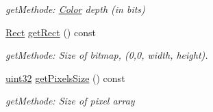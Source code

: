 \begin{DoxyCompactItemize}
\begin{DoxyCompactList}\small\item\em getMethode: \hyperlink{class_f2_c_1_1_color}{Color} depth (in bits) \item\end{DoxyCompactList}\item 
\hypertarget{class_f2_c_1_1_bitmap_aad73aad4b46f5f6f95815a734a8a1282}{
\hyperlink{class_f2_c_1_1_rect}{Rect} \hyperlink{class_f2_c_1_1_bitmap_aad73aad4b46f5f6f95815a734a8a1282}{getRect} () const }
\label{class_f2_c_1_1_bitmap_aad73aad4b46f5f6f95815a734a8a1282}

\begin{DoxyCompactList}\small\item\em getMethode: Size of bitmap, (0,0, width, height). \item\end{DoxyCompactList}\item 
\hypertarget{class_f2_c_1_1_bitmap_a4f32e523592d6f8067e6237811c0b2aa}{
\hyperlink{namespace_f2_c_ae9a1fcf27e85dd8fb51e9a30db5ad871}{uint32} \hyperlink{class_f2_c_1_1_bitmap_a4f32e523592d6f8067e6237811c0b2aa}{getPixelsSize} () const }
\label{class_f2_c_1_1_bitmap_a4f32e523592d6f8067e6237811c0b2aa}

\begin{DoxyCompactList}\small\item\em getMethode: Size of pixel array \item\end{DoxyCompactList}\end{DoxyCompactItemize}


